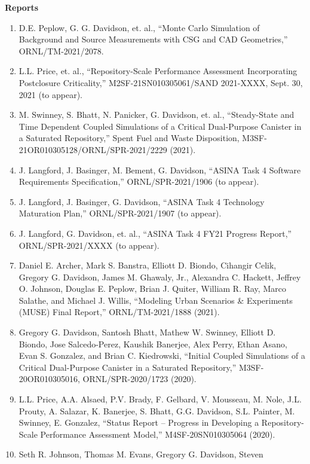 \documentclass[letterpaper,11pt]{article}
\newcommand{\leftsubheading}[1]{
  \textbf{#1\vspace{-6pt} \\}}
\begin{document}
\leftsubheading{Reports}
\begin{enumerate}
  \item D.E. Peplow, G. G. Davidson, et. al., ``Monte Carlo Simulation
    of Background and Source Measurements with CSG and CAD
    Geometries,'' ORNL/TM-2021/2078.
  \item L.L. Price, et. al., ``Repository-Scale Performance Assessment
    Incorporating Postclosure Criticality,'' M2SF-21SN010305061/SAND
    2021-XXXX, Sept. 30, 2021 (to appear).
  \item M. Swinney, S. Bhatt, N. Panicker, G. Davidson, et. al.,
      ``Steady-State and Time Dependent Coupled Simulations of a
      Critical Dual-Purpose Canister in a Saturated Repository,''
      Spent Fuel and Waste Disposition,
      M3SF-21OR010305128/ORNL/SPR-2021/2229 (2021).
  \item J. Langford, J. Basinger, M. Bement, G. Davidson, ``ASINA Task
    4 Software Requirements Specification,'' ORNL/SPR-2021/1906 (to
    appear).
  \item J. Langford, J. Basinger, G. Davidson, ``ASINA Task 4
      Technology Maturation Plan,'' ORNL/SPR-2021/1907 (to appear).
   \item J. Langford, G. Davidson, et. al., ``ASINA Task 4 FY21
        Progress Report,'' ORNL/SPR-2021/XXXX (to appear).
  \item Daniel E. Archer, Mark S. Banstra, Elliott D. Biondo,
    Cihangir Celik, Gregory G. Davidson, James M. Ghawaly, Jr.,
    Alexandra C. Hackett, Jeffrey O. Johnson, Douglas E. Peplow, Brian
    J. Quiter, William R. Ray, Marco Salathe, and Michael J. Willis,
    ``Modeling Urban Scenarios \& Experiments (MUSE) Final Report,''
    ORNL/TM-2021/1888 (2021).
  \item Gregory G. Davidson, Santosh Bhatt, Mathew W. Swinney, Elliott
    D. Biondo, Jose Salcedo-Perez, Kaushik Banerjee, Alex Perry, Ethan
    Asano, Evan S. Gonzalez, and Brian C. Kiedrowski, ``Initial
    Coupled Simulations of a Critical Dual-Purpose Canister in a
    Saturated Repository,'' M3SF-20OR010305016, ORNL/SPR-2020/1723
    (2020). 
  \item L.L. Price, A.A. Alsaed, P.V. Brady, F. Gelbard, V. Mousseau,
    M. Nole, J.L. Prouty, A. Salazar, K. Banerjee, S. Bhatt,
    G.G. Davidson, S.L. Painter, M. Swinney, E. Gonzalez, ``Status
    Report -- Progress in Developing a Repository-Scale Performance
    Assessment Model,'' M4SF-20SN010305064 (2020).
  \item Seth R. Johnson, Thomas M. Evans, Gregory G. Davidson, Steven

\end{enumerate}
\end{document}
